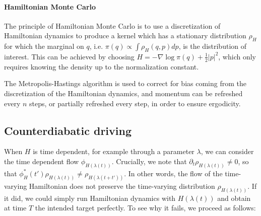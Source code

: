 \documentclass{article}
\begin{document}



\paragraph{Hamiltonian Monte Carlo} The principle of Hamiltonian Monte Carlo is to use a discretization of Hamiltonian dynamics to produce a kernel which has a stationary distribution $\rho_H$ for which the marginal on $q$, i.e. $\pi(q) \propto \int \rho_H(q,p) dp$, is the distribution of interest. This can be achieved by choosing $H = -\nabla\log\pi(q) + \frac{1}{2}|p|^2$, which only requires knowing the density up to the normalization constant.

The Metropolis-Hastings algorithm \cite{chib1995understanding} is used to correct for bias coming from the discretization of the Hamiltonian dynamics, and momentum can be refreshed every $n$ steps, or partially refreshed every step, in order to ensure ergodicity.


\subsection{Counterdiabatic driving}

When $H$ is time dependent, for example through a parameter $\lambda$, we can consider the time dependent flow $\phi_{H(\lambda(t))}$. Crucially, we note that $\partial_t\rho_{H(\lambda(t))} \neq 0$, so that $\phi^*_{H}(t')\rho_{H(\lambda(t))} \neq \rho_{H(\lambda(t+t'))}$. In other words, the flow of the time-varying Hamiltonian does not preserve the time-varying distribution $\rho_{H(\lambda(t))}$. If it did, we could simply run Hamiltonian dynamics with $H(\lambda(t))$ and obtain at time $T$ the intended target perfectly. To see why it fails, we proceed as follows:
\end{document}
